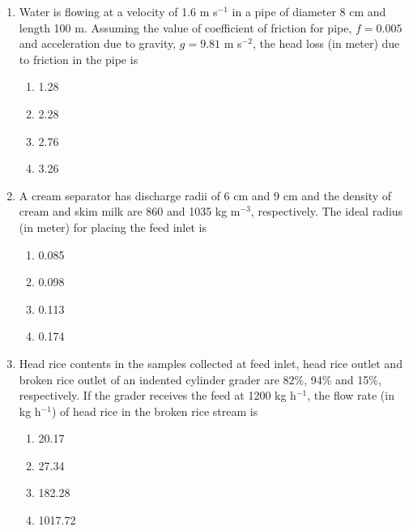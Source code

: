 \documentclass[12pt]{article}
\begin{document}
\begin{enumerate}[label =Q.\arabic*,start=26]
		\item Water is flowing at a velocity of 1.6 m s$^{-1}$ in a pipe of diameter 8 cm and length 100 m. Assuming the value of coefficient of friction for pipe, $f = 0.005$ and acceleration due to gravity, $g = 9.81$ m s$^{-2}$, the head loss (in meter) due to friction in the pipe is
			\begin{multicols}{4}
				\begin{enumerate}[label=(\Alph*)]
					\item 1.28
					\item 2.28
					\item 2.76
					\item 3.26
				\end{enumerate}
			\end{multicols}
			\newpage
		\item A cream separator has discharge radii of 6 cm and 9 cm and the density of cream and skim milk are 860 and 1035 kg m$^{-3}$, respectively. The ideal radius (in meter) for placing the feed inlet is
			\begin{multicols}{4}
				\begin{enumerate}[label=(\Alph*)]
					\item 0.085
					\item 0.098
					\item 0.113
					\item 0.174
				\end{enumerate}
			\end{multicols}

		\item Head rice contents in the samples collected at feed inlet, head rice outlet and broken rice outlet of an indented cylinder grader are 82\%, 94\% and 15\%, respectively. If the grader receives the feed at 1200 kg h$^{-1}$, the flow rate (in kg h$^{-1}$) of head rice in the broken rice stream is
			\begin{multicols}{4}
				\begin{enumerate}[label=(\Alph*)]
					\item 20.17
					\item 27.34
					\item 182.28
					\item 1017.72
				\end{enumerate}
			\end{multicols}


\end{enumerate}
\end{document}
